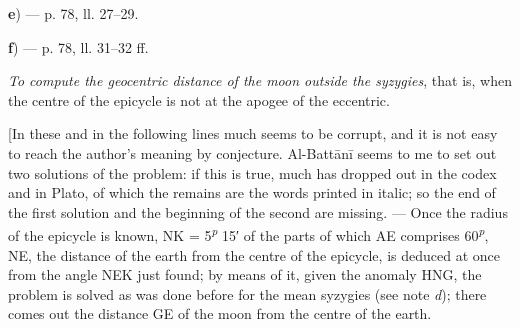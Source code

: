 \documentclass[11pt]{article}
\begin{document}
\par\begin{center}\textbf{e}) — p. 78, ll. 27–29.\end{center}
\begin{center}\end{center}
\par [«\emph{Take the product of the minutes of the fourth column into the fifth column} …».\par
\par Al-Battānī now wants to compute the amount of the semidiameter of the epicycle as seen from the earth, that is, the angle NEK, which is the greatest equation of the anomaly when the centre of the epicycle occupies the point N. The number of the fifth column cannot be known unless the anomaly HNK is given; but this is unknown, and it is the very thing that has to be found, for HNK = 90° + NEK. So one should have written not «\emph{into the fifth column}» but «\emph{into the greatest number of the fifth column}», that is, into 2° 40′. Schiaparelli.]\par
\par\begin{center}\textbf{f}) — p. 78, ll. 31–32 ff.\end{center}
\par \emph{To compute the geocentric distance of the moon outside the syzygies}, that is, when the centre of the epicycle is not at the apogee of the eccentric.\par
\par [In these and in the following lines much seems to be corrupt, and it is not easy to reach the author's meaning by conjecture. Al-Battānī seems to me to set out two solutions of the problem: if this is true, much has dropped out in the codex and in Plato, of which the remains are the words printed in italic; so the end of the first solution and the beginning of the second are missing. — Once the radius of the epicycle is known, NK = 5\textsuperscript{\itshape p} 15′ of the parts of which AE comprises 60\textsuperscript{\itshape p}, NE, the distance of the earth from the centre of the epicycle, is deduced at once from the angle NEK just found; by means of it, given the anomaly HNG, the problem is solved as was done before for the mean syzygies (see note \emph{d}); there comes out the distance GE of the moon from the centre of the earth.\par
\end{document}

